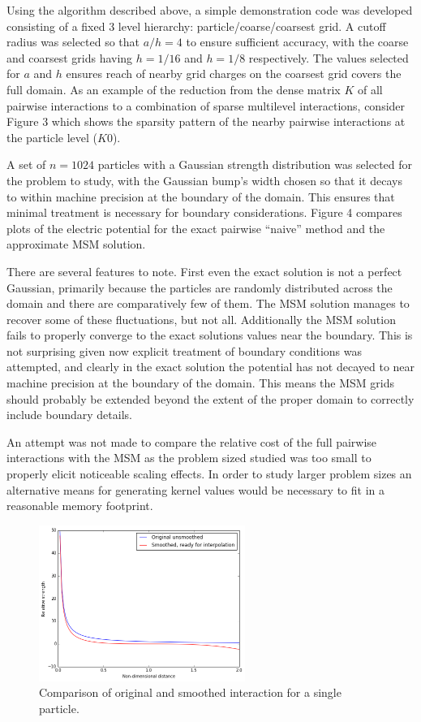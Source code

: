 \documentclass[review]{siamart}
\begin{document}
Using the algorithm described above, a simple demonstration code was developed consisting of a fixed 3 level hierarchy: particle/coarse/coarsest grid. A cutoff radius was selected so that $a/h = 4$ to ensure sufficient accuracy, with the coarse and coarsest grids having $h=1/16$ and $h=1/8$ respectively. The values selected for $a$ and $h$ ensures reach of nearby grid charges on the coarsest grid covers the full domain. As an example of the reduction from the dense matrix $K$ of all pairwise interactions to a combination of sparse multilevel interactions, consider Figure 3 which shows the sparsity pattern of the nearby pairwise interactions at the particle level ($K0$).

A set of $n=1024$ particles with a Gaussian strength distribution was selected for the problem to study, with the Gaussian bump's width chosen so that it decays to within machine precision at the boundary of the domain. This ensures that minimal treatment is necessary for boundary considerations. Figure 4 compares plots of the electric potential for the exact pairwise ``naive'' method and the approximate MSM solution.

There are several features to note. First even the exact solution is not a perfect Gaussian, primarily because the particles are randomly distributed across the domain and there are comparatively few of them. The MSM solution manages to recover some of these fluctuations, but not all. Additionally the MSM solution fails to properly converge to the exact solutions values near the boundary. This is not surprising given now explicit treatment of boundary conditions was attempted, and clearly in the exact solution the potential has not decayed to near machine precision at the boundary of the domain. This means the MSM grids should probably be extended beyond the extent of the proper domain to correctly include boundary details.

An attempt was not made to compare the relative cost of the full pairwise interactions with the MSM as the problem sized studied was too small to properly elicit noticeable scaling effects. In order to study larger problem sizes an alternative means for generating kernel values would be necessary to fit in a reasonable memory footprint.



\begin{figure}[!htb]
\centering
\includegraphics[width=0.6\textwidth]{smooth.PNG}
\caption{Comparison of original and smoothed interaction for a single particle.}
\end{figure}
\end{document}
